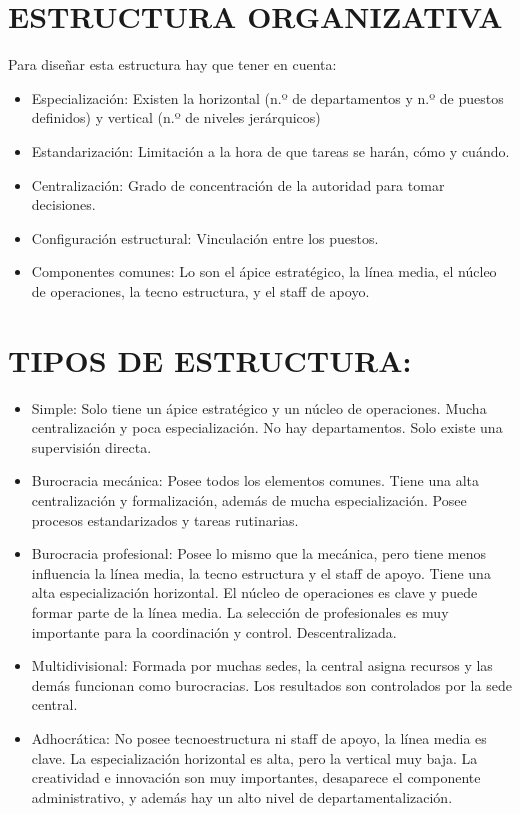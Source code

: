 \documentclass[12pt, twoside, openright]{report} %
\begin{document}
\section{ESTRUCTURA ORGANIZATIVA}
Para diseñar esta estructura hay que tener en cuenta:
\begin{itemize}
	\item Especialización: Existen la horizontal (n.º de departamentos y n.º de puestos definidos) y
	      vertical (n.º de niveles jerárquicos)
	\item Estandarización: Limitación a la hora de que tareas se harán, cómo y cuándo.
	\item Centralización: Grado de concentración de la autoridad para tomar decisiones.
	\item Configuración estructural: Vinculación entre los puestos.
	\item Componentes comunes: Lo son el ápice estratégico, la línea media, el núcleo de operaciones,
	      la tecno estructura, y el staff de apoyo.
\end{itemize}

\section{TIPOS DE ESTRUCTURA:}
\begin{itemize}
	\item Simple: Solo tiene un ápice estratégico y un núcleo de operaciones. Mucha centralización y poca especialización. No hay departamentos. Solo existe una supervisión directa.
	\item Burocracia mecánica: Posee todos los elementos comunes. Tiene una alta centralización y formalización, además de mucha especialización. Posee procesos estandarizados y tareas rutinarias.
	\item Burocracia profesional: Posee lo mismo que la mecánica, pero tiene menos influencia la línea media, la tecno estructura y el staff de apoyo. Tiene una alta especialización horizontal. El núcleo de operaciones es clave y puede formar parte de la línea media. La selección de profesionales es muy importante para la coordinación y control. Descentralizada.
	\item Multidivisional: Formada por muchas sedes, la central asigna recursos y las demás funcionan como burocracias. Los resultados son controlados por la sede central.
	\item Adhocrática: No posee tecnoestructura ni staff de apoyo, la línea media es clave. La especialización horizontal es alta, pero la vertical muy baja. La creatividad e innovación son muy importantes, desaparece el componente administrativo, y además hay un alto nivel de departamentalización.
\end{itemize}
\pagebreak
\end{document}
